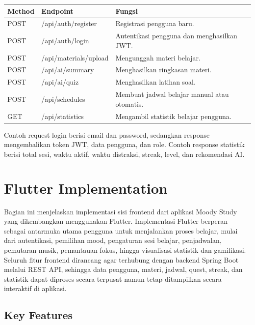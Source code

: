 \documentclass[11pt]{article}
\begin{document}
\begin{center}
\renewcommand{\arraystretch}{1.3}
\begin{tabular}{|p{}|p{}|p{}|}
\hline
\textbf{Method} & \textbf{Endpoint} & \textbf{Fungsi} \\
\hline
POST & /api/auth/register & Registrasi pengguna baru. \\
\hline
POST & /api/auth/login & Autentikasi pengguna dan menghasilkan JWT. \\
\hline
POST & /api/materials/upload & Mengunggah materi belajar. \\
\hline
POST & /api/ai/summary & Menghasilkan ringkasan materi. \\
\hline
POST & /api/ai/quiz & Menghasilkan latihan soal. \\
\hline
POST & /api/schedules & Membuat jadwal belajar manual atau otomatis. \\
\hline
GET & /api/statistics & Mengambil statistik belajar pengguna. \\
\hline
\end{tabular}
\end{center}

Contoh request login berisi email dan password, sedangkan response mengembalikan token JWT, data pengguna, dan role. Contoh response statistik berisi total sesi, waktu aktif, waktu distraksi, streak, level, dan rekomendasi AI.


\section{Flutter Implementation}

Bagian ini menjelaskan implementasi sisi frontend dari aplikasi Moody Study yang dikembangkan menggunakan Flutter. Implementasi Flutter berperan sebagai antarmuka utama pengguna untuk menjalankan proses belajar, mulai dari autentikasi, pemilihan mood, pengaturan sesi belajar, penjadwalan, pemutaran musik, pemantauan fokus, hingga visualisasi statistik dan gamifikasi. Seluruh fitur frontend dirancang agar terhubung dengan backend Spring Boot melalui REST API, sehingga data pengguna, materi, jadwal, quest, streak, dan statistik dapat diproses secara terpusat namun tetap ditampilkan secara interaktif di aplikasi.

\subsection{Key Features}
\end{document}
